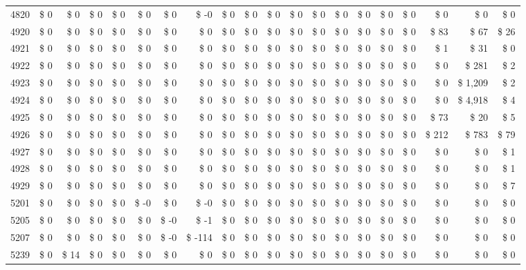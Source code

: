 \begin{longtable}{lrrrrrrrrrrrrrrrrrrr}
4820 & \$ 0 & \$ 0 & \$ 0 & \$ 0 & \$ 0 & \$ 0 & \$ -0 & \$ 0 & \$ 0 & \$ 0 & \$ 0 & \$ 0 & \$ 0 & \$ 0 & \$ 0 & \$ 0 & \$ 0 & \$ 0 & \$ 0 \\
4920 & \$ 0 & \$ 0 & \$ 0 & \$ 0 & \$ 0 & \$ 0 & \$ 0 & \$ 0 & \$ 0 & \$ 0 & \$ 0 & \$ 0 & \$ 0 & \$ 0 & \$ 0 & \$ 0 & \$ 83 & \$ 67 & \$ 26 \\
4921 & \$ 0 & \$ 0 & \$ 0 & \$ 0 & \$ 0 & \$ 0 & \$ 0 & \$ 0 & \$ 0 & \$ 0 & \$ 0 & \$ 0 & \$ 0 & \$ 0 & \$ 0 & \$ 0 & \$ 1 & \$ 31 & \$ 0 \\
4922 & \$ 0 & \$ 0 & \$ 0 & \$ 0 & \$ 0 & \$ 0 & \$ 0 & \$ 0 & \$ 0 & \$ 0 & \$ 0 & \$ 0 & \$ 0 & \$ 0 & \$ 0 & \$ 0 & \$ 0 & \$ 281 & \$ 2 \\
4923 & \$ 0 & \$ 0 & \$ 0 & \$ 0 & \$ 0 & \$ 0 & \$ 0 & \$ 0 & \$ 0 & \$ 0 & \$ 0 & \$ 0 & \$ 0 & \$ 0 & \$ 0 & \$ 0 & \$ 0 & \$ 1,209 & \$ 2 \\
4924 & \$ 0 & \$ 0 & \$ 0 & \$ 0 & \$ 0 & \$ 0 & \$ 0 & \$ 0 & \$ 0 & \$ 0 & \$ 0 & \$ 0 & \$ 0 & \$ 0 & \$ 0 & \$ 0 & \$ 0 & \$ 4,918 & \$ 4 \\
4925 & \$ 0 & \$ 0 & \$ 0 & \$ 0 & \$ 0 & \$ 0 & \$ 0 & \$ 0 & \$ 0 & \$ 0 & \$ 0 & \$ 0 & \$ 0 & \$ 0 & \$ 0 & \$ 0 & \$ 73 & \$ 20 & \$ 5 \\
4926 & \$ 0 & \$ 0 & \$ 0 & \$ 0 & \$ 0 & \$ 0 & \$ 0 & \$ 0 & \$ 0 & \$ 0 & \$ 0 & \$ 0 & \$ 0 & \$ 0 & \$ 0 & \$ 0 & \$ 212 & \$ 783 & \$ 79 \\
4927 & \$ 0 & \$ 0 & \$ 0 & \$ 0 & \$ 0 & \$ 0 & \$ 0 & \$ 0 & \$ 0 & \$ 0 & \$ 0 & \$ 0 & \$ 0 & \$ 0 & \$ 0 & \$ 0 & \$ 0 & \$ 0 & \$ 1 \\
4928 & \$ 0 & \$ 0 & \$ 0 & \$ 0 & \$ 0 & \$ 0 & \$ 0 & \$ 0 & \$ 0 & \$ 0 & \$ 0 & \$ 0 & \$ 0 & \$ 0 & \$ 0 & \$ 0 & \$ 0 & \$ 0 & \$ 1 \\
4929 & \$ 0 & \$ 0 & \$ 0 & \$ 0 & \$ 0 & \$ 0 & \$ 0 & \$ 0 & \$ 0 & \$ 0 & \$ 0 & \$ 0 & \$ 0 & \$ 0 & \$ 0 & \$ 0 & \$ 0 & \$ 0 & \$ 7 \\
5201 & \$ 0 & \$ 0 & \$ 0 & \$ 0 & \$ -0 & \$ 0 & \$ -0 & \$ 0 & \$ 0 & \$ 0 & \$ 0 & \$ 0 & \$ 0 & \$ 0 & \$ 0 & \$ 0 & \$ 0 & \$ 0 & \$ 0 \\
5205 & \$ 0 & \$ 0 & \$ 0 & \$ 0 & \$ 0 & \$ -0 & \$ -1 & \$ 0 & \$ 0 & \$ 0 & \$ 0 & \$ 0 & \$ 0 & \$ 0 & \$ 0 & \$ 0 & \$ 0 & \$ 0 & \$ 0 \\
5207 & \$ 0 & \$ 0 & \$ 0 & \$ 0 & \$ 0 & \$ -0 & \$ -114 & \$ 0 & \$ 0 & \$ 0 & \$ 0 & \$ 0 & \$ 0 & \$ 0 & \$ 0 & \$ 0 & \$ 0 & \$ 0 & \$ 0 \\
5239 & \$ 0 & \$ 14 & \$ 0 & \$ 0 & \$ 0 & \$ 0 & \$ 0 & \$ 0 & \$ 0 & \$ 0 & \$ 0 & \$ 0 & \$ 0 & \$ 0 & \$ 0 & \$ 0 & \$ 0 & \$ 0 & \$ 0 \\

\end{longtable}
